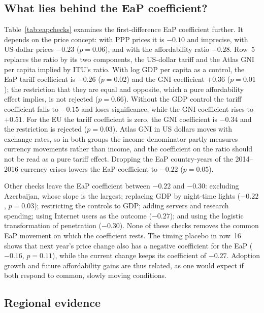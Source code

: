 \documentclass[pdflatex,sn-basic]{sn-jnl}
\begin{document}


\subsection{What lies behind the EaP coefficient?}

Table~\ref{tab:eapchecks} examines the first-difference EaP coefficient further. It depends on the price concept: with PPP prices it is $-0.10$ and imprecise, with US-dollar prices $-0.23$ ($p=0.06$), and with the affordability ratio $-0.28$. Row~5 replaces the ratio by its two components, the US-dollar tariff and the Atlas GNI per capita implied by ITU's ratio. With log GDP per capita as a control, the EaP tariff coefficient is $-0.26$ ($p=0.02$) and the GNI coefficient $+0.36$ ($p=0.01$); the restriction that they are equal and opposite, which a pure affordability effect implies, is not rejected ($p=0.66$). Without the GDP control the tariff coefficient falls to $-0.15$ and loses significance, while the GNI coefficient rises to $+0.51$. For the EU the tariff coefficient is zero, the GNI coefficient is $-0.34$ and the restriction is rejected ($p=0.03$). Atlas GNI in US dollars moves with exchange rates, so in both groups the income denominator partly measures currency movements rather than income, and the coefficient on the ratio should not be read as a pure tariff effect. Dropping the EaP country-years of the 2014--2016 currency crises lowers the EaP coefficient to $-0.22$ ($p=0.05$).

Other checks leave the EaP coefficient between $-0.22$ and $-0.30$: excluding Azerbaijan, whose slope is the largest; replacing GDP by night-time lights ($-0.22$, $p=0.03$); restricting the controls to GDP; adding servers and research spending; using Internet users as the outcome ($-0.27$); and using the logistic transformation of penetration ($-0.30$). None of these checks removes the common EaP movement on which the coefficient rests. The timing placebo in row~16 shows that next year's price change also has a negative coefficient for the EaP ($-0.16$, $p=0.11$), while the current change keeps its coefficient of $-0.27$. Adoption growth and future affordability gains are thus related, as one would expect if both respond to common, slowly moving conditions.



\subsection{Regional evidence}
\end{document}
